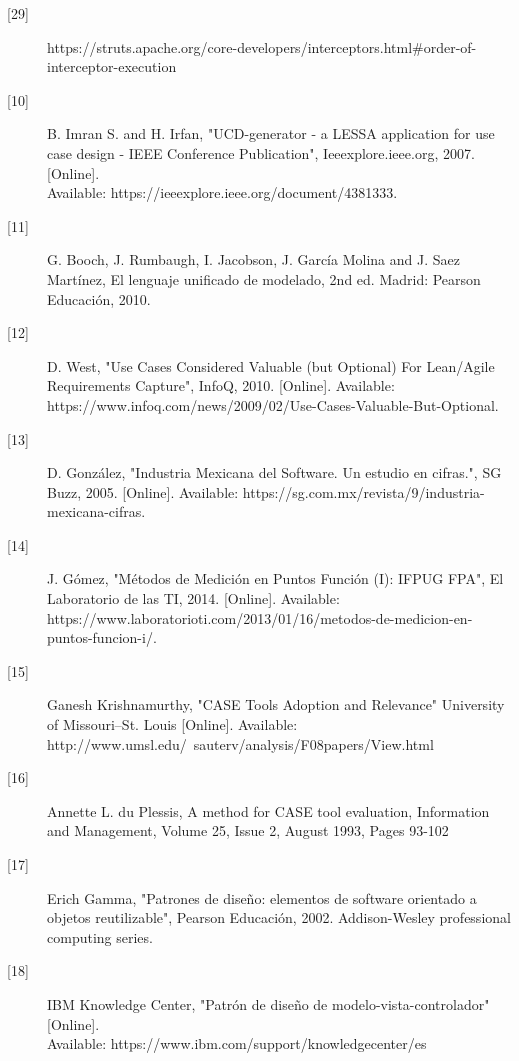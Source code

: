 \begin{description}
		
		\item[\hypertarget{b29}{[29]}]
		https://struts.apache.org/core-developers/interceptors.html\#order-of-interceptor-execution
		
		\item[\hypertarget{b10}{[10]}] B. Imran S. and H. Irfan, "UCD-generator - a LESSA application for use case design - IEEE Conference Publication", Ieeexplore.ieee.org, 2007. [Online]. \\Available: https://ieeexplore.ieee.org/document/4381333.
		
		\item[\hypertarget{b11}{[11]}] G. Booch, J. Rumbaugh, I. Jacobson, J. García Molina and J. Saez Martínez, El lenguaje unificado de modelado, 2nd ed. Madrid: Pearson Educación, 2010.
		
		\item[\hypertarget{b12}{[12]}] D. West, "Use Cases Considered Valuable (but Optional) For Lean/Agile Requirements Capture", InfoQ, 2010. [Online]. Available: https://www.infoq.com/news/2009/02/Use-Cases-Valuable-But-Optional. 
		
		\item[\hypertarget{b13}{[13]}] D. González, "Industria Mexicana del Software. Un estudio en cifras.", SG Buzz, 2005. [Online]. Available: https://sg.com.mx/revista/9/industria-mexicana-cifras. 
		
		\item[\hypertarget{b14}{[14]}] J. Gómez, "Métodos de Medición en Puntos Función (I): IFPUG FPA", El Laboratorio de las TI, 2014. [Online]. Available: https://www.laboratorioti.com/2013/01/16/metodos-de-medicion-en-puntos-funcion-i/. 
		
		\item[\hypertarget{b15}{[15]}] Ganesh Krishnamurthy, "CASE Tools 
		Adoption and Relevance" University of Missouri–St. Louis [Online]. Available: http://www.umsl.edu/~sauterv/analysis/F08papers/View.html
		
		\item[\hypertarget{b16}{[16]}] Annette L. du Plessis, A method for CASE tool evaluation, Information and Management, Volume 25, Issue 2, August 1993, Pages 93-102
		
		\item[\hypertarget{b17}{[17]}]	Erich Gamma, "Patrones de diseño: elementos de software orientado a objetos reutilizable", Pearson Educación, 2002. Addison-Wesley professional computing series.
		
		\item[\hypertarget{b18}{[18]}] IBM Knowledge Center, "Patrón de diseño de modelo-vista-controlador" [Online].\\ Available: https://www.ibm.com/support/knowledgecenter/es
		

\end{description}
